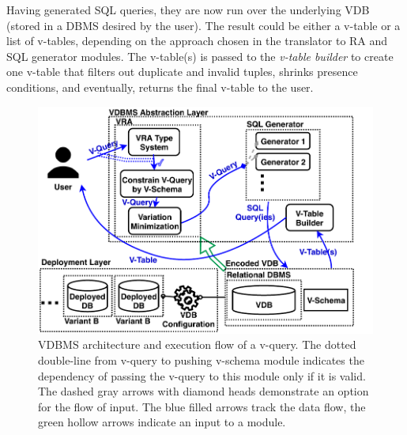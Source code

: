 Having generated SQL queries, they are now run over the underlying 
VDB (stored in a DBMS desired by the user). The result could be either 
a v-table or a list of v-tables, depending on the approach chosen in 
the translator to RA and SQL generator modules. The v-table(s) is passed
to the \emph{v-table builder}
to create one v-table that filters out 
duplicate and invalid tuples, shrinks presence conditions, and 
eventually, returns the final v-table to the user.

\begin{figure}
\centering
\includegraphics[scale = 0.7] {figs/arch7.pdf}
\caption{VDBMS architecture and execution flow of a v-query. 
The dotted double-line from v-query to pushing v-schema module
indicates the dependency of passing the v-query to this module
only if it is valid. 
The dashed gray arrows with diamond heads demonstrate
an option for the flow of input. 
The blue filled arrows track the data flow, the green hollow arrows 
indicate an input to a module.}
\label{fig:arch}
\end{figure}


